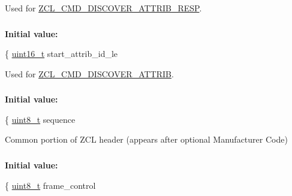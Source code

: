 Used for \hyperlink{group__zcl_gae15c30229c1d8a8cdee1bd92b2cc6a15}{Z\-C\-L\-\_\-\-C\-M\-D\-\_\-\-D\-I\-S\-C\-O\-V\-E\-R\-\_\-\-A\-T\-T\-R\-I\-B\-\_\-\-R\-E\-S\-P}. 

\hypertarget{group__zcl_gab0970af8e1b078745a55523dd60bdff6}{
\subsubsection[{zcl\-\_\-discover\-\_\-attrib\-\_\-t}]{}}\label{group__zcl_gab0970af8e1b078745a55523dd60bdff6}
{\bfseries Initial value\-:}
\begin{DoxyCode}
\{
   \hyperlink{group__hal_ga5a8b2dc9e45a9ee81a94ef304fb62505}{uint16\_t}  start\_attrib\_id\_le
\end{DoxyCode}


Used for \hyperlink{group__zcl_ga2919d6fc8068efac4c9969938a4b9ff5}{Z\-C\-L\-\_\-\-C\-M\-D\-\_\-\-D\-I\-S\-C\-O\-V\-E\-R\-\_\-\-A\-T\-T\-R\-I\-B}. 

\hypertarget{group__zcl_gaece1b64b04ac629f83358d6d815451a5}{
\subsubsection[{zcl\-\_\-header\-\_\-common\-\_\-t}]{}}\label{group__zcl_gaece1b64b04ac629f83358d6d815451a5}
{\bfseries Initial value\-:}
\begin{DoxyCode}
\{
   \hyperlink{group__hal_gae1affc9ca37cfb624959c866a73f83c2}{uint8\_t} sequence
\end{DoxyCode}


Common portion of Z\-C\-L header (appears after optional Manufacturer Code) 

\hypertarget{group__zcl_gae988eb59c8a2e75b6cb34aefeca315d1}{
\subsubsection[{zcl\-\_\-header\-\_\-nomfg\-\_\-t}]{}}\label{group__zcl_gae988eb59c8a2e75b6cb34aefeca315d1}
{\bfseries Initial value\-:}
\begin{DoxyCode}
\{
   \hyperlink{group__hal_gae1affc9ca37cfb624959c866a73f83c2}{uint8\_t} frame\_control
\end{DoxyCode}


